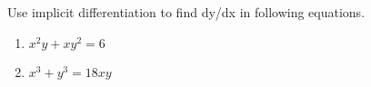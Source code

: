 \documentclass{article}
\begin{document}
\thispagestyle{empty}

Use implicit differentiation to find dy/dx in following equations.

\begin{enumerate}
   \item $x^2 y + x y^2 = 6$

    \item $x^3 + y^3 = 18xy$
\end{enumerate}
\end{document}
